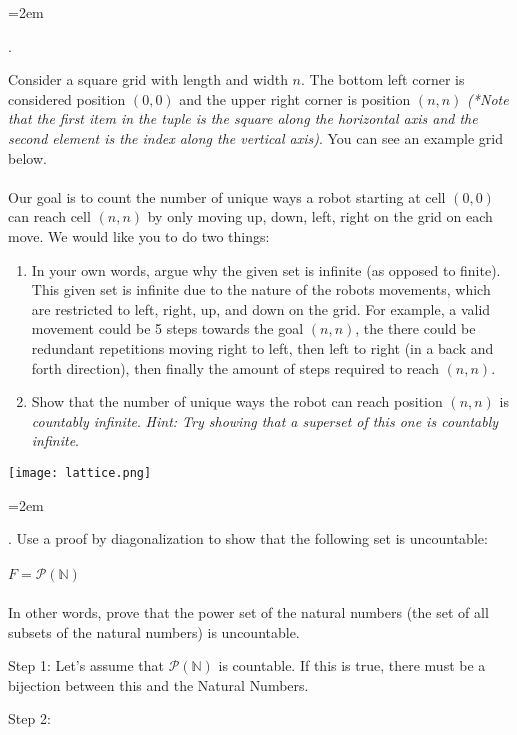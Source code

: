 \documentclass[12pt]{article}
\newcounter{quesnum}
\newcommand{\question}[2][??]{
\begin{list}{\labelitemi}{\leftmargin=2em}
\item [\arabic{quesnum}.] {} {#2}
\end{list}
\addtocounter{quesnum}{1}
}
\begin{document}
\vspace{12pt}



\question[3]{
Consider a square grid with length and width $n$. The bottom left corner is considered position $(0,0)$ and the upper right corner is position $(n,n)$ \emph{(*Note that the first item in the tuple is the square along the horizontal axis and the second element is the index along the vertical axis)}. You can see an example grid below.\\
\\
Our goal is to count the number of unique ways a robot starting at cell $(0,0)$ can reach cell $(n,n)$ by only moving up, down, left, right on the grid on each move. We would like you to do two things:

\begin{enumerate}
	\item In your own words, argue why the given set is infinite (as opposed to finite). This given set is infinite due to the nature of the robots movements, which are restricted to left, right, up, and down on the grid. For example, a valid movement could be 5 steps towards the goal $(n,n)$, the there could be redundant repetitions moving right to left, then left to right (in a back and forth direction), then finally the amount of steps required to reach $(n,n)$. 
	\item Show that the number of unique ways the robot can reach position $(n,n)$ is \emph{countably infinite}. \emph{Hint: Try showing that a superset of this one is countably infinite}.
\end{enumerate}
}

\texttt{[image: lattice.png]}

\vspace{12pt}

\question[3]{
Use a proof by diagonalization to show that the following set is uncountable:\\
\\
$F= \mathcal{P}(\mathbb{N}) $
\\
\\
In other words, prove that the power set of the natural numbers (the set of all subsets of the natural numbers) is uncountable.
}

Step 1: Let's assume that $\mathcal{P}(\mathbb{N})$ is countable. If this is true, there must be a bijection between this and the Natural Numbers.

Step 2:

\vspace{12pt}
\end{document}
